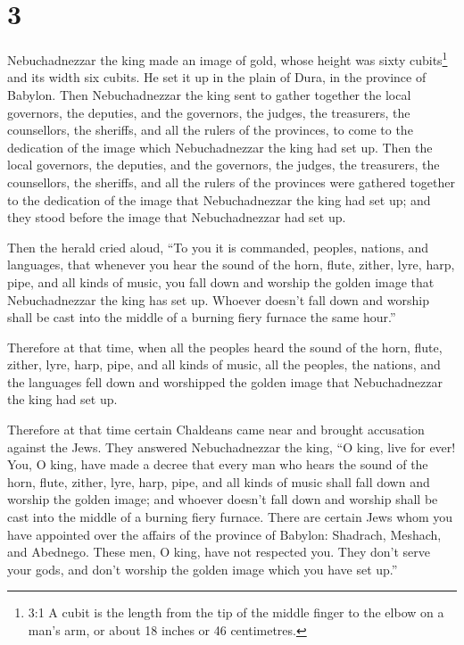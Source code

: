 \hypertarget{section-2}{%
\section{3}\label{section-2}}

 Nebuchadnezzar the king made an image of gold, whose height
was sixty cubits\footnote{3:1 A cubit is the length from the tip of the
  middle finger to the elbow on a man's arm, or about 18 inches or 46
  centimetres.} and its width six cubits. He set it up in the plain of
Dura, in the province of Babylon.  Then Nebuchadnezzar the
king sent to gather together the local governors, the deputies, and the
governors, the judges, the treasurers, the counsellors, the sheriffs,
and all the rulers of the provinces, to come to the dedication of the
image which Nebuchadnezzar the king had set up.  Then the
local governors, the deputies, and the governors, the judges, the
treasurers, the counsellors, the sheriffs, and all the rulers of the
provinces were gathered together to the dedication of the image that
Nebuchadnezzar the king had set up; and they stood before the image that
Nebuchadnezzar had set up.

 Then the herald cried aloud, ``To you it is commanded,
peoples, nations, and languages,  that whenever you hear the
sound of the horn, flute, zither, lyre, harp, pipe, and all kinds of
music, you fall down and worship the golden image that Nebuchadnezzar
the king has set up.  Whoever doesn't fall down and worship
shall be cast into the middle of a burning fiery furnace the same
hour.''

 Therefore at that time, when all the peoples heard the
sound of the horn, flute, zither, lyre, harp, pipe, and all kinds of
music, all the peoples, the nations, and the languages fell down and
worshipped the golden image that Nebuchadnezzar the king had set up.

 Therefore at that time certain Chaldeans came near and
brought accusation against the Jews.  They answered
Nebuchadnezzar the king, ``O king, live for ever!  You, O
king, have made a decree that every man who hears the sound of the horn,
flute, zither, lyre, harp, pipe, and all kinds of music shall fall down
and worship the golden image;  and whoever doesn't fall
down and worship shall be cast into the middle of a burning fiery
furnace.  There are certain Jews whom you have appointed
over the affairs of the province of Babylon: Shadrach, Meshach, and
Abednego. These men, O king, have not respected you. They don't serve
your gods, and don't worship the golden image which you have set up.''

